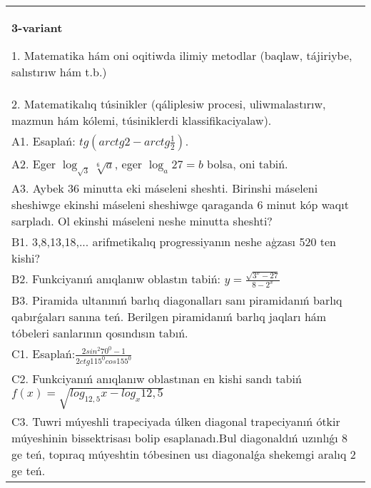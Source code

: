 \documentclass{article}
\begin{document}
\begin{tabular}{m{17cm}}
\textbf{3-variant}

1. Matematika hám oni oqitiwda ilimiy metodlar (baqlaw, tájiriybe, salıstırıw hám t.b.) \\
2. Matematikalıq túsinikler (qáliplesiw procesi, uliwmalastırıw, mazmun hám kólemi, túsiniklerdi klassifikaciyalaw). \\
A1. Esaplań: \(tg\left(arctg2 - arctg\frac{1}{2} \right) \). \\
A2. Eger \(\log_{\sqrt{3}}\sqrt[6]{a}\), eger \(\log_{a}27 = b\) bolsa, oni tabiń. \\
A3. Aybek 36 minutta eki máseleni sheshti. Birinshi máseleni sheshiwge ekinshi máseleni sheshiwge qaraganda 6 minut kóp waqıt sarpladı. Ol ekinshi máseleni neshe minutta sheshti? \\
B1. 3,8,13,18,... arifmetikalıq progressiyanın neshe aģzası 520 ten kishi? \\
B2. Funkciyanıń anıqlanıw oblastın tabiń: \(y = \frac{\sqrt{3^{x} - 27}}{8 - 2^{x}}\) \\
B3. Piramida ultanınıń barlıq diagonalları sanı piramidanıń barlıq qabırǵaları sanına teń. Berilgen piramidanıń barlıq jaqları hám tóbeleri sanlarının qosındısın tabıń. \\
C1. Esaplań:\(\frac{2sin^{2}70^{0} - 1}{2ctg115^{0}cos155^{0}}\) \\
C2. Funkciyanıń anıqlanıw oblastınan en kishi sandı tabiń \(f (x) = \sqrt{log_{12,5}x - log_{x}12,5}\) \\
C3. Tuwri múyeshli trapeciyada úlken diagonal trapeciyanıń ótkir múyeshinin bissektrisası bolip esaplanadı.Bul diagonaldıń uzınlıǵı 8 ge teń, topıraq múyeshtin tóbesinen usı diagonalǵa shekemgi aralıq 2 ge teń. \\

\end{tabular}
\vspace{1cm}
\end{document}
